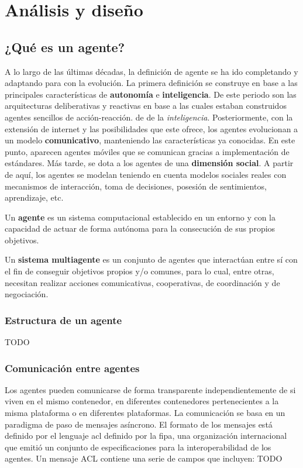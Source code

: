 \chapter{Análisis y diseño}
    \label{chap:four}

\renewcommand{\labelitemi}{$\bullet$}
\renewcommand{\labelitemii}{$\circ$}
\renewcommand{\labelitemiii}{$\Rightarrow$}

\section{¿Qué es un agente?}
A lo largo de las últimas décadas, la definición de agente se ha ido completando y adaptando para con la evolución. 
\newline La primera definición se construye en base a las principales características de \textbf{autonomía} e \textbf{inteligencia}. De este periodo son las arquitecturas deliberativas y reactivas en base a las cuales estaban construidos agentes sencillos de acción-reacción. de  de la \textit{inteligencia}. 
\newline Posteriormente, con la extensión de internet y las posibilidades que este ofrece, los agentes evolucionan a un modelo \textbf{comunicativo}, manteniendo las características ya conocidas. En este punto, aparecen agentes móviles que se comunican gracias a implementación de estándares.
\newline Más tarde, se dota a los agentes de una \textbf{dimensión social}. A partir de aquí, los agentes se modelan teniendo en cuenta modelos sociales reales con mecanismos de interacción, toma de decisiones, posesión de sentimientos, aprendizaje, etc.

Un \textbf{agente} es un sistema computacional establecido en un entorno y con la capacidad de actuar de forma autónoma para la consecución de sus propios objetivos.

Un \textbf{sistema multiagente} es un conjunto de agentes que interactúan entre sí con el fin de conseguir objetivos propios y/o comunes, para lo cual, entre otras, necesitan realizar acciones comunicativas, cooperativas, de coordinación y de negociación.
\newline \cite{dba2122, intelligent_agents}

\newpage
\subsection{Estructura de un agente}
TODO

\subsection{Comunicación entre agentes}
Los agentes pueden comunicarse de forma transparente independientemente de si viven en el mismo contenedor, en diferentes contenedores pertenecientes a la misma plataforma o en diferentes plataformas. La comunicación se basa en un paradigma de paso de mensajes asíncrono. El formato de los mensajes está definido por el lenguaje \acrfull{acl} definido por la \acrfull{fipa}, una organización internacional que emitió un conjunto de especificaciones para la interoperabilidad de los agentes. Un mensaje ACL contiene una serie de campos que incluyen:
TODO


